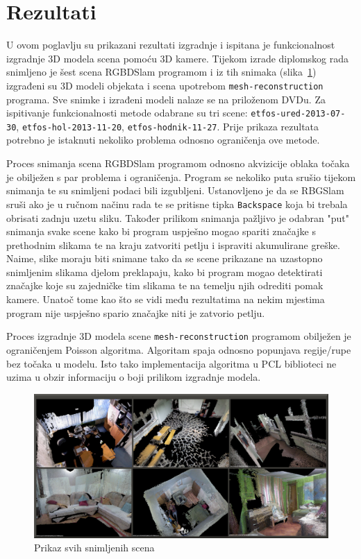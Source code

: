 \newpage
\setcounter{figure}{0}

\section{Rezultati} %
\label{sec:Rezultati}

U ovom poglavlju su prikazani rezultati izgradnje i ispitana je
funkcionalnost izgradnje 3D modela scena pomoću 3D kamere.  Tijekom
izrade diplomskog rada snimljeno je šest scena RGBDSlam programom i iz
tih snimaka (slika~\ref{fig:01-all.png}) izgrađeni su 3D modeli objekata
i scena upotrebom \texttt{mesh-reconstruction} programa.  Sve snimke i
izrađeni modeli nalaze se na priloženom DVDu.  Za ispitivanje
funkcionalnosti metode odabrane su tri scene:
\texttt{etfos-ured-2013-07-30}, \texttt{etfos-hol-2013-11-20},
\texttt{etfos-hodnik-11-27}. Prije prikaza rezultata potrebno je
istaknuti nekoliko problema odnosno ograničenja ove metode.

Proces snimanja scena RGBDSlam programom odnosno akvizicije oblaka
točaka je obilježen s par problema i ograničenja. Program se nekoliko
puta srušio tijekom snimanja te su snimljeni podaci bili izgubljeni.
Ustanovljeno je da se RBGSlam sruši ako je u ručnom načinu rada te se
pritisne tipka \texttt{Backspace} koja bi trebala obrisati zadnju uzetu
sliku. Također prilikom snimanja pažljivo je odabran "put" snimanja
svake scene kako bi program uspješno mogao spariti značajke s prethodnim
slikama te na kraju zatvoriti petlju i ispraviti akumulirane greške.
Naime, slike moraju biti snimane tako da se scene prikazane na uzastopno
snimljenim slikama djelom preklapaju, kako bi program mogao detektirati
značajke koje su zajedničke tim slikama te na temelju njih odrediti
pomak kamere. Unatoč tome kao što se vidi među rezultatima na nekim
mjestima program nije uspješno spario značajke niti je zatvorio petlju.

Proces izgradnje 3D modela scene \texttt{mesh-reconstruction} programom
obilježen je ograničenjem Poisson algoritma. Algoritam spaja odnosno
popunjava regije/rupe bez točaka u modelu. Isto tako implementacija
algoritma u PCL biblioteci ne uzima u obzir informaciju o boji prilikom
izgradnje modela.

\begin{figure}[h]
\centering
\includegraphics[scale=0.20]{figures/01-all-pcd.png}
\caption{Prikaz svih snimljenih scena}
\label{fig:01-all.png}
\end{figure}

